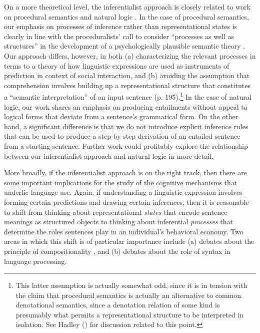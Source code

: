 \documentclass[utf8]{frontiersSCNS} %
\begin{document}
On a more theoretical level, the inferentialist approach is closely related to work on procedural semantics \citep{Johnson:1977} and natural logic \citep{Lakoff:1970}. In the case of procedural semantics, our emphasis on processes of inference rather than representational states is clearly in line with the proceduralists' call to consider ``processes as well as structures'' in the development of a psychologically plausible semantic theory \citep[][p. 193]{Johnson:1977}. Our approach differs, however, in both (a) characterizing the relevant processes in terms to a theory of how linguistic expressions are used as instruments of prediction in context of social interaction, and (b) avoiding the assumption that comprehension involves building up a representational structure that constitutes a ``semantic interpretation'' of an input sentence (p. 195).\footnote{This latter assumption is actually somewhat odd, since it is in tension with the claim that procedural semantics is actually an alternative to common denotational semantics, since a denotation relation of some kind is presumably what permits a representational structure to be interpreted in isolation. See Hadley (\citeyear{Hadley:1989}) for discussion related to this point.} In the case of natural logic, our work shares an emphasis on producing entailments without appeal to logical forms that deviate from a sentence's grammatical form. On the other hand, a significant difference is that we do not introduce explicit inference rules that can be used to produce a step-by-step derivation of an entailed sentence from a starting sentence. Further work could profitably explore the relationship between our inferentialist approach and natural logic in more detail.   

More broadly, if the inferentialist approach is on the right track, then there are some important implications for the study of the cognitive mechanisms that underlie language use. Again, if understanding a linguistic expression involves forming certain predictions and drawing certain inferences, then it is reasonable to shift from thinking about representational \textit{states} that encode sentence meanings as structured objects to thinking about inferential \textit{processes} that determine the roles sentences play in an individual's behavioral economy. Two areas in which this shift is of particular importance include (a) debates about the principle of compositionality \citep{Szabo:2013}, and (b) debates about the role of syntax in language processing.
\end{document}
